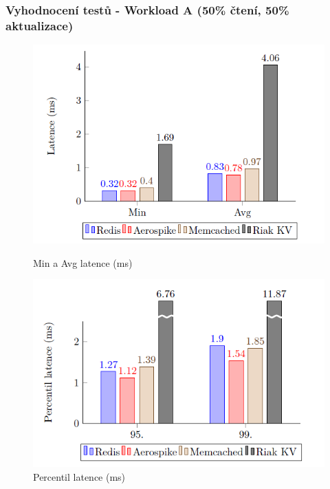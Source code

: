 \documentclass{beamer}
\begin{document}
	\begin{frame}
		\frametitle{Vyhodnocení testů - Workload A (50\% čtení, 50\% aktualizace)}
		\begin{figure}
			\begin{minipage}[b]{0.45\linewidth}
				\centering
				\includegraphics[width=\textwidth]{Figures/graf_wa_min_avg.PNG}
				\caption{Min a Avg latence (ms)}
			\end{minipage}
			\hspace{0.5cm}
			\begin{minipage}[b]{0.45\linewidth}
				\centering
				\includegraphics[width=\textwidth]{Figures/graf_perc.PNG}
				\caption{Percentil latence (ms)}
			\end{minipage}
		\end{figure}
	\end{frame}
	
\end{document}
